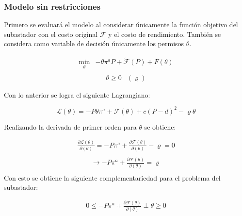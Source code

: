 \subsubsection{Modelo sin restricciones}

Primero se evaluará el modelo al considerar únicamente la función objetivo del subastador con el costo original $\mathcal{F}$ y el costo de rendimiento. También se considera como variable de decisión únicamente los permisos $\theta$.  

\begin{equation}
\begin{array}{rrclcl}
    \displaystyle \min_{\theta} & -\theta \pi^aP + \tilde{\mathcal{F}}(P)+F(\theta)  \label{fo:perfornorest}\\
\end{array}
\end{equation}
\begin{equation}
\begin{array}{cl}
    \theta \geq 0 & (\varrho)\label{res:sub2}
\end{array}
\end{equation}

Con lo anterior se logra el siguiente Lagrangiano:

$$\mathcal{L}(\theta)=-P\theta\pi^a+\mathcal{F}(\theta)+c(P-d)^2 - \varrho\theta $$

Realizando la derivada de primer orden para $\theta$ se obtiene:

\begin{equation}
\begin{array}{rrclcl}
    \frac{\partial\mathcal{L}(\theta)}{\partial (\theta)}=-P\pi^a+\frac{\partial\mathcal{F}(\theta)}{\partial(\theta)}-\varrho=0 \label{lag1}\\
\end{array}
\end{equation}
\begin{equation}
\begin{array}{rrclcl}
    \rightarrow -P\pi^a+\frac{\partial\mathcal{F}(\theta)}{\partial(\theta)}=\varrho \label{lag1}\\
\end{array}
\end{equation}
Con esto se obtiene la siguiente complementariedad para el problema del subastador:

\begin{equation}
\begin{array}{rrclcl}
    0\leq -P\pi^a+\frac{\partial\mathcal{F}(\theta)}{\partial(\theta)}\perp \theta \geq 0 \label{compllag1}\\
\end{array}
\end{equation}

